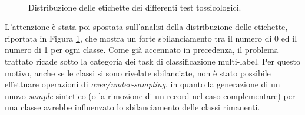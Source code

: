 \begin{figure}[!ht]
	\quad
	\\
	\quad
	\quad	{}\quad
	\caption{Distribuzione delle etichette dei differenti test tossicologici.}
	\label{fig:class_distribution}
\end{figure}
L'attenzione è stata poi spostata sull'analisi della distribuzione delle etichette, riportata in Figura \ref{fig:class_distribution}, che mostra un forte sbilanciamento tra il numero di 0 ed il numero di 1 per ogni classe. Come già accennato in precedenza, il problema trattato ricade sotto la categoria dei task di classificazione multi-label. Per questo motivo, anche se le classi si sono rivelate sbilanciate, non è stato possibile effettuare operazioni di \textit{over/under-sampling}, in quanto la generazione di un nuovo \textit{sample} sintetico (o la rimozione di un record nel caso complementare) per una classe avrebbe influenzato lo sbilanciamento delle classi rimanenti. \\
